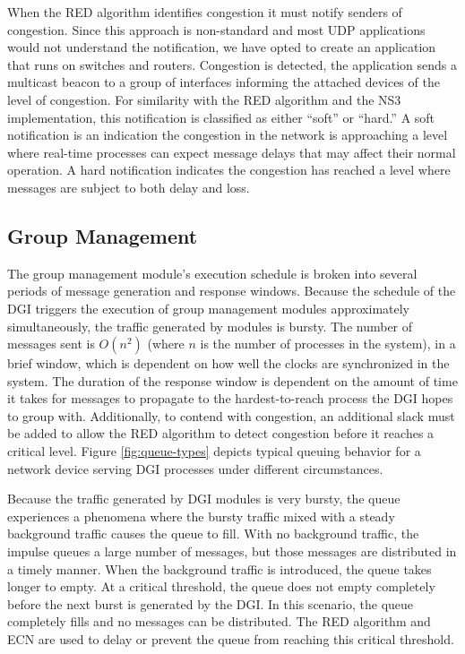 When the \ac{RED} algorithm identifies congestion it must notify senders of congestion.
Since this approach is non-standard and most UDP applications would not understand the notification, we have opted to create an application that runs on switches and routers.
Congestion is detected, the application sends a multicast beacon to a group of interfaces informing the attached devices of the level of congestion.
For similarity with the \ac{RED} algorithm and the \ac{NS3} implementation, this notification is classified as either ``soft'' or ``hard.''
A soft notification is an indication the congestion in the network is approaching a level where real-time processes can expect message delays that may affect their normal operation.
A hard notification indicates the congestion has reached a level where messages are subject to both delay and loss.

\subsection{Group Management}

The group management module's execution schedule is broken into several periods of message generation and response windows.
Because the schedule of the \ac{DGI} triggers the execution of group management modules approximately simultaneously, the traffic generated by modules is bursty.
The number of messages sent is $O(n^2)$ (where $n$ is the number of processes in the system), in a brief window, which is dependent on how well the clocks are synchronized in the system.
The duration of the response window is dependent on the amount of time it takes for messages to propagate to the hardest-to-reach process the \ac{DGI} hopes to group with.
Additionally, to contend with congestion, an additional slack must be added to allow the \ac{RED} algorithm to detect congestion before it reaches a critical level.
Figure \ref{fig:queue-types} depicts typical queuing behavior for a network device serving \ac{DGI} processes under different circumstances.

Because the traffic generated by \ac{DGI} modules is very bursty, the queue experiences a phenomena where the bursty traffic mixed with a steady background traffic causes the queue to fill.
With no background traffic, the impulse queues a large number of messages, but those messages are distributed in a timely manner.
When the background traffic is introduced, the queue takes longer to empty.
At a critical threshold, the queue does not empty completely before the next burst is generated by the \ac{DGI}.
In this scenario, the queue completely fills and no messages can be distributed.
The \ac{RED} algorithm and \ac{ECN} are used to delay or prevent the queue from reaching this critical threshold.

